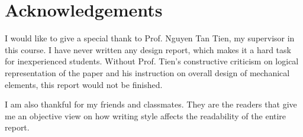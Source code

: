 \chapter*{Acknowledgements}
	
	I would like to give a special thank to Prof. Nguyen Tan Tien, my supervisor in this course. I have never written any design report, which makes it a hard task for inexperienced students. Without Prof. Tien's constructive criticism on logical representation of the paper and his instruction on overall design of mechanical elements, this report would not be finished.
	
	I am also thankful for my friends and classmates. They are the readers that give me an objective view on how writing style affects the readability of the entire report.